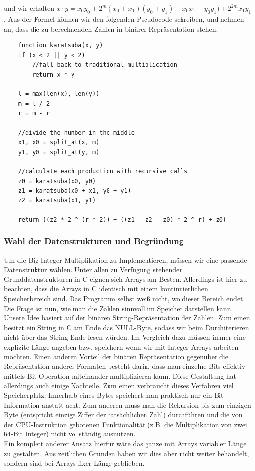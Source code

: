 \documentclass[course=erap]{aspdoc}
\begin{document}
und wir erhalten $x \cdot y = x_0y_0 + 2^m(x_0+x_1)(y_0+y_1) - x_0x_1 - y_0y_1) + 2^{2m}x_1y_1$.
Aus der Formel können wir den folgenden Pseudocode schreiben, und nehmen an, dass die zu berechnenden Zahlen in binärer Repräsentation stehen.
\begin{lstlisting}
    function karatsuba(x, y)
    if (x < 2 || y < 2)
        //fall back to traditional multiplication
        return x * y
    
    l = max(len(x), len(y))
    m = l / 2
    r = m - r 
    
    //divide the number in the middle
    x1, x0 = split_at(x, m)
    y1, y0 = split_at(y, m)
    
    //calculate each production with recursive calls 
    z0 = karatsuba(x0, y0)
    z1 = karatsuba(x0 + x1, y0 + y1)
    z2 = karatsuba(x1, y1)
    
    return ((z2 * 2 ^ (r * 2)) + ((z1 - z2 - z0) * 2 ^ r) + z0)
\end{lstlisting}

\subsubsection{Wahl der Datenstrukturen und Begründung}
Um die Big-Integer Multiplikation zu Implementieren, müssen wir eine passende Datenstruktur wählen. Unter allen zu Verfügung stehenden Grunddatenstrukturen in C eignen sich Arrays am Besten. Allerdings ist hier zu beachten, dass die Arrays in C identisch mit einem kontinuierlichen Speicherbereich sind. Das Programm selbst weiß nicht, wo dieser Bereich endet. Die Frage ist nun, wie man die Zahlen sinnvoll im Speicher darstellen kann. Unsere Idee basiert auf der binären String-Repräsentation der Zahlen. Zum einen besitzt ein String in C am Ende das NULL-Byte, sodass wir beim Durchiterieren nicht über das String-Ende lesen würden. Im Vergleich dazu müssen immer eine explizite Länge angeben bzw. speichern wenn wir mit Integer-Arrays arbeiten möchten. Einen anderen Vorteil der binären Repräsentation gegenüber die Repräsentation anderer Formaten besteht darin, dass man einzelne Bits effektiv mittels Bit-Operation miteinander multiplizieren kann. Diese Gestaltung hat allerdings auch einige Nachteile. Zum einen verbraucht dieses Verfahren viel Speicherplatz: Innerhalb eines Bytes speichert man praktisch nur ein Bit Information anstatt acht. Zum anderen muss man die Rekursion bis zum einzigen Byte (entspricht einzige Ziffer der tatsächlichen Zahl) durchführen und die von der CPU-Instruktion gebotenen Funktionalität (z.B. die Multiplikation von zwei 64-Bit Integer) nicht vollständig ausnutzen. 
\\Ein komplett anderer Ansatz hierfür wäre das ganze mit Arrays variabler Länge zu gestalten. Aus zeitlichen Gründen haben wir dies aber nicht weiter behandelt, sondern sind bei Arrays fixer Länge geblieben.
\end{document}
